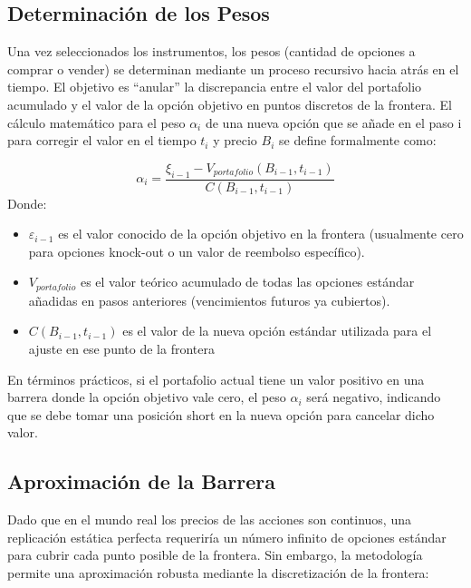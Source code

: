 \subsection{Determinación de los Pesos}

Una vez seleccionados los instrumentos, los pesos (cantidad de opciones a comprar o vender) se determinan mediante un proceso recursivo hacia atrás en el tiempo. El objetivo es ``anular'' la discrepancia entre el valor del portafolio acumulado y el valor de la opción objetivo en puntos discretos de la frontera.
El cálculo matemático para el peso $\alpha_i$ de una nueva opción que se añade en el paso i para corregir el valor en el tiempo $t_i$ y precio $B_i$ se define formalmente como:

\begin{equation} 
  \alpha_i = \frac{\xi_{i-1} - V_{portafolio}(B_{i-1}, t_{i-1})}{C(B_{i-1}, t_{i-1})} 
\end{equation}
Donde: 

\begin{itemize} 
  \item $\varepsilon_{i-1}$ es el valor conocido de la opción objetivo en la frontera (usualmente cero para opciones knock-out o un valor de reembolso específico). 
  
  \item $V_{portafolio}$ es el valor teórico acumulado de todas las opciones estándar añadidas en pasos anteriores (vencimientos futuros ya cubiertos). 
  
  \item $C(B_{i-1},t_{i-1})$ es el valor de la nueva opción estándar utilizada para el ajuste en ese punto de la frontera
\end{itemize}

En términos prácticos, si el portafolio actual tiene un valor positivo en una barrera donde la opción objetivo vale cero, el peso $\alpha_i$ será negativo, indicando que se debe tomar una posición short en la nueva opción para cancelar dicho valor.

\subsection{Aproximación de la Barrera}

Dado que en el mundo real los precios de las acciones son continuos, una replicación estática perfecta requeriría un número infinito de opciones estándar para cubrir cada punto posible de la frontera. Sin embargo, la metodología permite una aproximación robusta mediante la discretización de la frontera:

